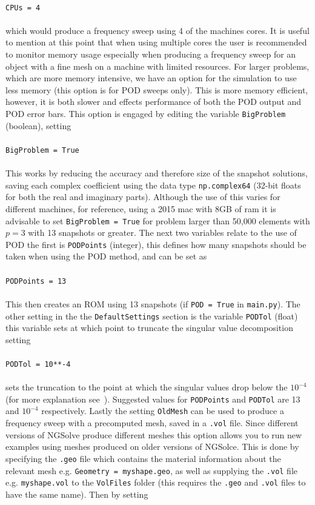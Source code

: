 \\
\texttt{CPUs = 4}\\
\\
which would produce a frequency sweep using 4 of the machines cores. It is useful to mention at this point that when using multiple cores the user is recommended to monitor memory usage especially when producing a frequency sweep for an object with a fine mesh on a machine with limited resources. For larger problems, which are more memory intensive, we have an option for the simulation to use less memory (this option is for POD sweeps only). This is more memory efficient, however, it is both slower and effects performance of both the POD output and POD error bars. This option is engaged by editing the variable \texttt{BigProblem} (boolean), setting\\
\\
\texttt{BigProblem = True}\\
\\
This works by reducing the accuracy and therefore size of the snapshot solutions, saving each complex coefficient using the data type \texttt{np.complex64} (32-bit floats for both the real and imaginary parts). Although the use of this varies for different machines, for reference, using a 2015 mac with 8GB of ram it is advisable to set \texttt{BigProblem = True} for problem larger than 50,000 elements with $p=3$ with 13 snapshots or greater. The next two variables relate to the use of POD the first is \texttt{PODPoints} (integer), this defines how many snapshots should be taken when using the POD method, and can be set as\\
\\
\texttt{PODPoints = 13}\\
\\
This then creates an ROM using 13 snapshots (if \texttt{POD = True} in \texttt{main.py}). The other setting in the the \texttt{DefaultSettings} section is the variable \texttt{PODTol} (float) this variable sets at which point to truncate the singular value decomposition setting\\
\\
\texttt{PODTol = 10**-4}\\
\\
sets the truncation to the point at which the singular values drop below the $10^{-4}$ (for more explanation see~\cite{wilsonledger2019}). Suggested values for \texttt{PODPoints} and \texttt{PODTol} are 13 and $10^{-4}$ respectively. Lastly the setting \texttt{OldMesh} can be used to produce a frequency sweep with a precomputed mesh, saved in a \texttt{.vol} file. Since different versions of NGSolve produce different meshes this option allows you to run new examples using meshes produced on older versions of NGSolce. This is done by specifying the \texttt{.geo} file which contains the material information about the relevant mesh e.g. \texttt{Geometry = myshape.geo}, as well as supplying the \texttt{.vol} file e.g. \texttt{myshape.vol} to the \texttt{VolFiles} folder (this requires the \texttt{.geo} and \texttt{.vol} files to have the same name). Then by setting\\
